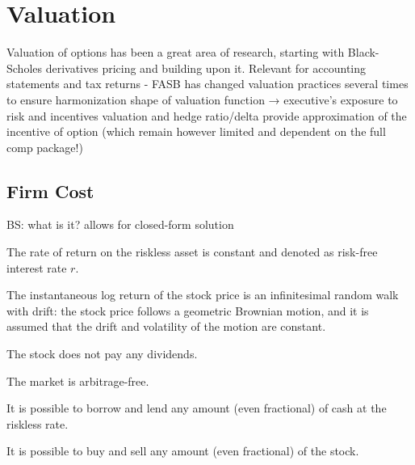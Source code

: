 \section{Valuation}
Valuation of options has been a great area of research, starting with Black-Scholes derivatives pricing and building upon it.
    Relevant for accounting statements and tax returns - FASB has changed valuation practices several times to ensure harmonization
    shape of valuation function → executive's exposure to risk and incentives
    valuation and hedge ratio/delta provide approximation of the incentive of option (which remain however limited and dependent on the full comp package!)


\subsection{Firm Cost} 

BS: what is it?
    allows for closed-form solution
    \begin{assumption}
        The rate of return on the riskless asset is constant and denoted as risk-free interest rate $r$.
    \end{assumption}
        
    \begin{assumption}
        The instantaneous log return of the stock price is an infinitesimal random walk with drift: the stock price follows a geometric Brownian motion, and it is assumed that the drift and volatility of the motion are constant.
    \end{assumption}

    \begin{assumption}
        The stock does not pay any dividends.
    \end{assumption}

    \begin{assumption}
        The market is arbitrage-free.
    \end{assumption}

    \begin{assumption}
        It is possible to borrow and lend any amount (even fractional) of cash at the riskless rate.
    \end{assumption}

    \begin{assumption}
        It is possible to buy and sell any amount (even fractional) of the stock.
    \end{assumption}
    
